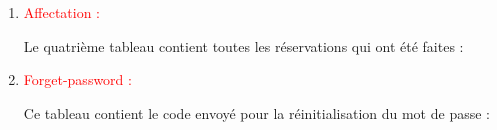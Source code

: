 \documentclass{article}
\begin{document}
\begin{enumerate}
\begin{enumerate}
\begin{enumerate}
\begin{enumerate}
	  
\vspace{3cm}	  
	  
	  \item \textcolor{red}{Affectation :}
	  
	  Le quatrième tableau contient toutes les réservations qui ont été faites :	 
	  
	  \vspace{1cm} 
		
		\hspace*{-1.05in}
               \noindent{}
	  
	  
	  \vspace{1cm}
	  
	  \item \textcolor{red}{Forget-password :}
	  
		Ce tableau contient le code envoyé pour la réinitialisation du mot de passe :	
		\vspace{1cm}  
		
		\hspace*{-1.05in}
               \noindent{}	  
	  

\end{enumerate}
\end{enumerate}
\end{enumerate}
\end{enumerate}
\end{document}
